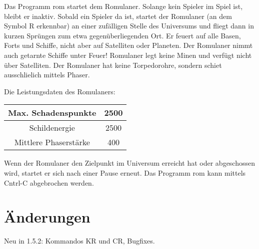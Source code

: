 Das Programm {\sf rom} startet dem Romulaner. Solange kein Spieler
im Spiel ist, bleibt er inaktiv. Sobald ein Spieler da ist, startet der
Romulaner (an dem Symbol R erkennbar) an einer zuf\"alligen Stelle
des Universums und fliegt dann in kurzen Spr\"ungen zum etwa 
gegen\"uberliegenden Ort. Er feuert auf alle Basen, Forts und
Schiffe, nicht aber auf Satelliten oder Planeten. Der Romulaner nimmt auch
getarnte Schiffe unter Feuer! Romulaner legt keine Minen und verf\"ugt nicht
\"uber Satelliten. Der Romulaner hat keine Torpedorohre, sondern
schie\3t ausschlie\3lich mittels Phaser.

\begin{center}

Die Leistungsdaten des Romulaners:


\begin{tabular}{|c|c|}\hline
Max. Schadenspunkte & 2500 \\ \hline
Schildenergie & 2500 \\ \hline
Mittlere Phaserst\"arke & 400 \\ \hline
\end{tabular}
\end{center}

Wenn der Romulaner den Zielpunkt im Universum erreicht hat oder abgeschossen
wird, startet er sich nach einer Pause erneut. Das Programm {\sf rom} 
kann mittels Cntrl-C abgebrochen werden.

\section{\"Anderungen}

Neu in 1.5.2: Kommandos KR und CR, Bugfixes.



